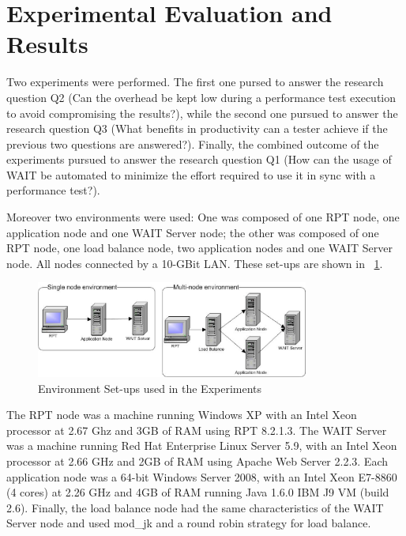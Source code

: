 \documentclass[runningheads,a4paper]{llncs}
\begin{document}

\section{Experimental Evaluation and Results}


Two experiments were performed. The first one pursed to answer the
research question Q2 (Can the overhead be kept low during a performance test
execution to avoid compromising the results?), while the second one pursued to
answer the research question Q3 (What benefits in productivity can a tester achieve if the previous
two questions are answered?). Finally, the combined outcome of the experiments
pursued to answer the research question Q1 (How can the usage of WAIT be
automated to minimize the effort required to use it in sync with a performance test?).

Moreover two environments were used: One was composed of one RPT node,
one application node and one WAIT Server node; the other was composed of one RPT
node, one load balance node, two application nodes and one WAIT Server node. All
nodes connected by a 10-GBit LAN. These set-ups are shown in \figurename
~\ref{fig_env}.

\begin{figure}[!h]
\centering
\includegraphics[totalheight=.25\textheight,width=0.8\textwidth]{Environments}
\caption{Environment Set-ups used in the Experiments}
\label{fig_env}
\end{figure}

The RPT node was a machine running Windows XP with an Intel Xeon processor at
2.67 Ghz and 3GB of RAM using RPT 8.2.1.3. The WAIT Server was a machine running
Red Hat Enterprise Linux Server 5.9, with an Intel Xeon processor at 2.66 GHz
and 2GB of RAM using Apache Web Server 2.2.3. Each application node was a 64-bit
Windows Server 2008, with an Intel Xeon E7-8860 (4 cores) at 2.26 GHz and 4GB of
RAM running Java 1.6.0 IBM J9 VM (build 2.6). Finally, the load balance node had
the same characteristics of the WAIT Server node and used mod\_jk and a round
robin strategy for load balance.
\end{document}
